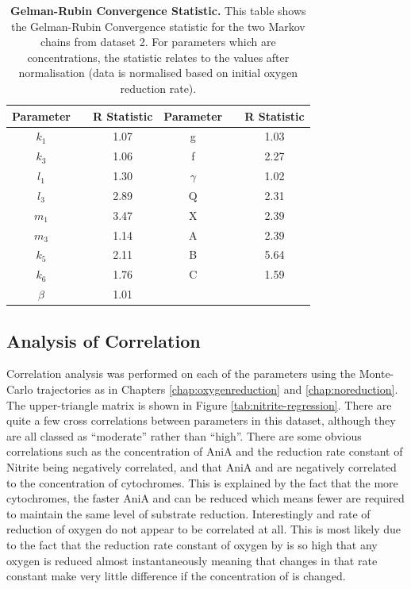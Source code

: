 \begin{table}[tbp]%
\renewcommand{\arraystretch}{1.5}
\begin{center}
\begin{tabular}{ccc|ccc}
\toprule
\textbf{Parameter} && \textbf{R Statistic} & \textbf{Parameter} && \textbf{R Statistic}\\
\midrule
$k_1$ && 1.07 & g && 1.03\\
$k_3$ && 1.06 & f && 2.27\\
$l_1$ && 1.30 & $\gamma$ && 1.02\\
$l_3$ && 2.89 & Q && 2.31\\
$m_1$ && 3.47 & X && 2.39\\
$m_3$ && 1.14 & A && 2.39\\
$k_5$ && 2.11 & B && 5.64\\
$k_6$ && 1.76 & C && 1.59\\
$\beta$ && 1.01\\
\bottomrule
\end{tabular}
\end{center}
\caption[Gelman-Rubin Convergence Statistic]{{\bf Gelman-Rubin Convergence Statistic.} This table shows the Gelman-Rubin Convergence statistic for the two Markov chains from dataset 2. For parameters which are concentrations, the statistic relates to the values after normalisation (data is normalised based on initial oxygen reduction rate).
\label{tab:nitrite-r-stat}}
\end{table}

\subsection{Analysis of Correlation}
Correlation analysis was performed on each of the parameters using the Monte-Carlo trajectories as in Chapters \ref{chap:oxygenreduction} and \ref{chap:noreduction}. The upper-triangle matrix is shown in Figure \ref{tab:nitrite-regression}. There are quite a few cross correlations between parameters in this dataset, although they are all classed as ``moderate'' rather than ``high''. There are some obvious correlations such as the concentration of AniA and the reduction rate constant of Nitrite being negatively correlated, and that AniA and \cbbthree{} are negatively correlated to the concentration of cytochromes. This is explained by the fact that the more cytochromes, the faster AniA and \cbbthree{} can be reduced which means fewer are required to maintain the same level of substrate reduction. Interestingly \cbbthree{} and rate of reduction of oxygen do not appear to be correlated at all. This is most likely due to the fact that the reduction rate constant of oxygen by \cbbthree{} is so high that any oxygen is 
reduced almost instantaneously meaning that changes in that rate constant make very little difference if the concentration of \cbbthree{} is changed.

